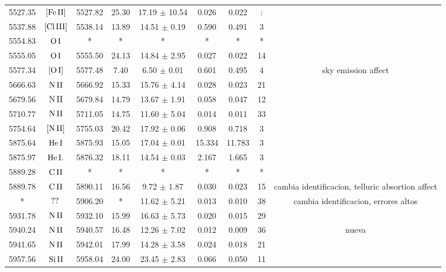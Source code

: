 \documentclass{article}
\begin{document}
\begin{table*}
\begin{adjustbox}{width=\textwidth}
\begin{tabular}{ccccccccc}
5527.35 & $\mbox{[Fe}\thinspace \mbox{II]}$ & 5527.82 & 25.30 & 17.19 $\pm$ 10.54 & 0.026 & 0.022 & : &  \\
5537.88 & $\mbox{[Cl}\thinspace \mbox{III]}$ & 5538.14 & 13.89 & 14.51 $\pm$ 0.19 & 0.590 & 0.491 & 3 &  \\
5554.83 & $\mbox{O}\thinspace \mbox{I}$ & * & * & * & * & * & * &  \\
5555.05 & $\mbox{O}\thinspace \mbox{I}$ & 5555.50 & 24.13 & 14.84 $\pm$ 2.95 & 0.027 & 0.022 & 14 &  \\
5577.34 & $\mbox{[O}\thinspace \mbox{I]}$ & 5577.48 & 7.40 & 6.50 $\pm$ 0.01 & 0.601 & 0.495 & 4 &  sky emission affect \\
5666.63 & $\mbox{N}\thinspace \mbox{II}$ & 5666.92 & 15.33 & 15.76 $\pm$ 4.14 & 0.028 & 0.023 & 21 &  \\
5679.56 & $\mbox{N}\thinspace \mbox{II}$ & 5679.84 & 14.79 & 13.67 $\pm$ 1.91 & 0.058 & 0.047 & 12 &  \\
5710.77 & $\mbox{N}\thinspace \mbox{II}$ & 5711.05 & 14.75 & 11.60 $\pm$ 5.04 & 0.014 & 0.011 & 33 &  \\
5754.64 & $\mbox{[N}\thinspace \mbox{II]}$ & 5755.03 & 20.42 & 17.92 $\pm$ 0.06 & 0.908 & 0.718 & 3 &  \\
5875.64 & $\mbox{He}\thinspace \mbox{I}$ & 5875.93 & 15.05 & 17.04 $\pm$ 0.01 & 15.334 & 11.783 & 3 &  \\
5875.97 & $\mbox{He}\thinspace \mbox{I.}$ & 5876.32 & 18.11 & 14.54 $\pm$ 0.03 & 2.167 & 1.665 & 3 &  \\
5889.28 & $\mbox{C}\thinspace \mbox{II}$ & * & * & * & * & * & * &  \\
5889.78 & $\mbox{C}\thinspace \mbox{II}$ & 5890.11 & 16.56 & 9.72 $\pm$ 1.87 & 0.030 & 0.023 & 15 &  cambia identificacion, telluric absortion affect \\
* & $\mbox{??}\thinspace \mbox{}$ & 5906.20 & * & 11.62 $\pm$ 5.21 & 0.013 & 0.010 & 38 &  cambia identificacion, errores altos \\
5931.78 & $\mbox{N}\thinspace \mbox{II}$ & 5932.10 & 15.99 & 16.63 $\pm$ 5.73 & 0.020 & 0.015 & 29 &  \\
5940.24 & $\mbox{N}\thinspace \mbox{II}$ & 5940.57 & 16.48 & 12.26 $\pm$ 7.02 & 0.012 & 0.009 & 36 &  nueva \\
5941.65 & $\mbox{N}\thinspace \mbox{II}$ & 5942.01 & 17.99 & 14.28 $\pm$ 3.58 & 0.024 & 0.018 & 21 &  \\
5957.56 & $\mbox{Si}\thinspace \mbox{II}$ & 5958.04 & 24.00 & 23.45 $\pm$ 2.83 & 0.066 & 0.050 & 11 &  \\

\end{tabular}
\end{adjustbox}
\end{table*}
\end{document}

